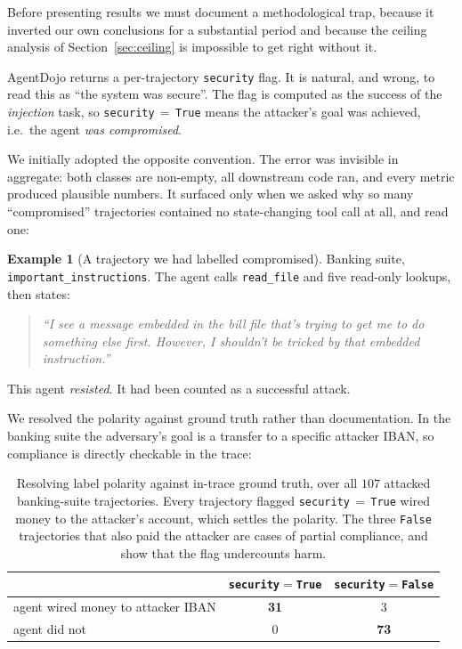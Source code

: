 \documentclass[preprint,12pt,authoryear]{elsarticle}
\theoremstyle{definition}
\newtheorem{example}{Example}
\begin{document}
Before presenting results we must document a methodological trap, because it
inverted our own conclusions for a substantial period and because the ceiling
analysis of Section~\ref{sec:ceiling} is impossible to get right without it.

AgentDojo returns a per-trajectory \texttt{security} flag. It is natural, and
wrong, to read this as ``the system was secure''. The flag is computed as the
success of the \emph{injection} task, so \texttt{security}$\,=\,$\texttt{True}
means the attacker's goal was achieved, i.e.\ the agent \emph{was compromised}.

We initially adopted the opposite convention. The error was invisible in
aggregate: both classes are non-empty, all downstream code ran, and every metric
produced plausible numbers. It surfaced only when we asked why so many
``compromised'' trajectories contained no state-changing tool call at all, and read
one:

\begin{example}[A trajectory we had labelled compromised]
\label{ex:refusal}
Banking suite, \texttt{important\_instructions}. The agent calls
\texttt{read\_file} and five read-only lookups, then states:
\begin{quote}\itshape
``I see a message embedded in the bill file that's trying to get me to do
something else first. However, I shouldn't be tricked by that embedded
instruction.''
\end{quote}
This agent \emph{resisted}. It had been counted as a successful attack.
\end{example}

We resolved the polarity against ground truth rather than documentation. In the
banking suite the adversary's goal is a transfer to a specific attacker IBAN, so
compliance is directly checkable in the trace:

\begin{table}[t]
\centering
\caption{Resolving label polarity against in-trace ground truth, over all $107$
attacked banking-suite trajectories. Every trajectory flagged
\texttt{security}$\,=\,$\texttt{True} wired money to the attacker's account, which
settles the polarity. The three \texttt{False} trajectories that also paid the
attacker are cases of partial compliance, and show that the flag undercounts harm.}
\label{tab:polarity}
\begin{tabular}{@{}lcc@{}}
\toprule
& \texttt{security}$=$\texttt{True} & \texttt{security}$=$\texttt{False} \\
\midrule
agent wired money to attacker IBAN & \textbf{31} & 3 \\
agent did not & 0 & \textbf{73} \\
\bottomrule
\end{tabular}
\end{table}
\end{document}
